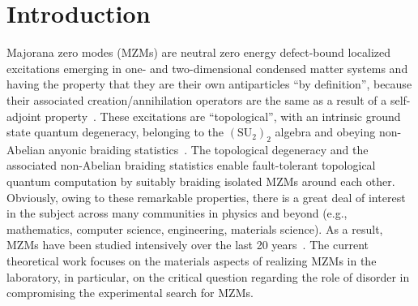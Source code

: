 \documentclass[aps,prmaterials,twocolumn,superscriptaddress,longbibliography]{revtex4-2}
\begin{document}
\maketitle

\section{Introduction}\label{sec:introduction}

Majorana zero modes (MZMs) are neutral zero energy defect-bound localized excitations emerging in one- and two-dimensional condensed matter systems and having the property that they are their own antiparticles ``by definition'', because their associated creation/annihilation operators are the same as a result of a self-adjoint property~\cite{sarma2015majorana,sau2021majorana}. These excitations are ``topological'', with an intrinsic ground state quantum degeneracy, belonging to the $(\text{SU}_2)_2$  algebra and obeying non-Abelian anyonic braiding statistics~\cite{nayak2008nonabelian}.  The topological degeneracy and the associated non-Abelian braiding statistics enable fault-tolerant topological quantum computation by suitably braiding isolated MZMs around each other. Obviously, owing to these remarkable properties, there is a great deal of interest in the subject across many communities in physics and beyond (e.g., mathematics, computer science, engineering, materials science). As a result, MZMs have been studied intensively over the last 20 years~\cite{read2000paired,kitaev2001unpaired,freedman2003topological,nayak2008nonabelian}.   The current theoretical work focuses on the materials aspects of realizing MZMs in the laboratory, in particular, on the critical question regarding the role of disorder in compromising the experimental search for MZMs.
\end{document}
